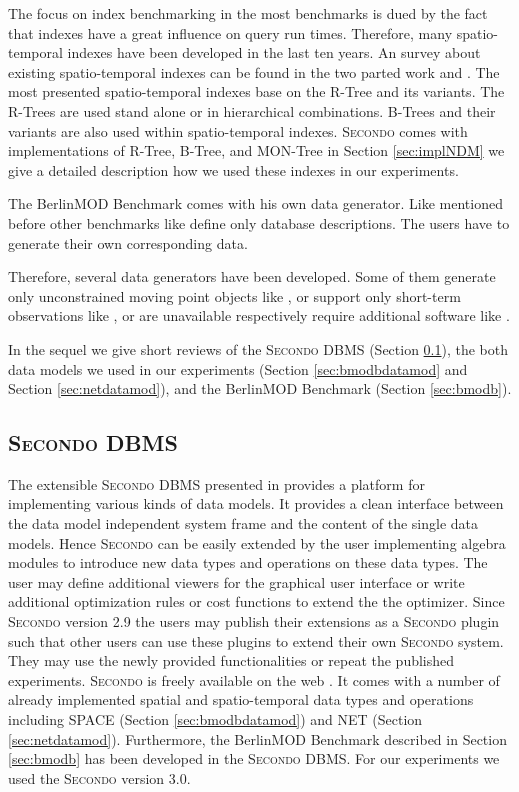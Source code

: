 \documentclass[a4paper]{article}
\newcommand{\secondo}{\textsc{Secondo}}
\newcommand{\bmodb} {BerlinMOD Benchmark}
\begin{document}
The focus on index benchmarking in the most benchmarks is dued by the fact that
indexes have a great influence on query run times. Therefore, many spatio-temporal
indexes have been developed in the last ten years. An survey about existing spatio-temporal
indexes can be found in the two parted work \cite{STAMSurvey1} and \cite{STAMSurvey2}.
The most presented spatio-temporal indexes base on the R-Tree \cite{RTreeGuttmann}
and its variants. The R-Trees are used stand alone or in hierarchical combinations.
B-Trees \cite{BTreeBayer} and their variants are also used within spatio-temporal
indexes. \secondo{} comes with implementations of R-Tree, B-Tree, and MON-Tree
\cite{MONTreeAlmeidaGeoinformatica} in Section \ref{sec:implNDM} we give a detailed
description how we used these indexes in our experiments.

The \bmodb{} comes with his own data generator. Like mentioned before other
benchmarks like \cite{QueriesTheodoridis} define only database descriptions.
The users have to generate their own corresponding data.

Therefore, several data generators have been developed. Some of them generate
only unconstrained moving point objects like \cite{OportoSaglio}, or support
only short-term observations like \cite{BrinkhoffsDataGenerator}, or are
unavailable respectively require additional software like \cite{STACTS}.

In the sequel we give short reviews of the \secondo{} DBMS
(Section \ref{sec:secondo}), the both data models we used in our experiments
(Section \ref{sec:bmodbdatamod} and Section \ref{sec:netdatamod}), and the \bmodb{}
(Section \ref{sec:bmodb}).
\subsection{\secondo{} DBMS}
\label{sec:secondo}
The extensible \secondo{} DBMS presented in
\cite{SecondoEnvironmentDieker,SecondoPlatformPrototypingGueting} provides a
platform for implementing various kinds of data models. It provides a clean
interface between the data model independent system frame and the content of the
single data models. Hence \secondo{} can be easily extended by the user
implementing algebra modules to introduce new data types and operations on
these data types. The user may define additional viewers for the graphical user
interface or write additional optimization rules or cost functions to extend the
the optimizer. Since \secondo{} version 2.9 the users may publish their extensions
as a \secondo{} plugin such that other users can use these plugins to extend their own
\secondo{} system. They may use the newly provided functionalities or repeat the
published experiments. \secondo{} is freely available on the web \cite{secondoweb}.
It comes with a number of already implemented spatial and spatio-temporal data types
and operations including SPACE (Section \ref{sec:bmodbdatamod}) and NET
(Section \ref{sec:netdatamod}). Furthermore, the \bmodb{}
described in Section \ref{sec:bmodb} has been developed in the \secondo{} DBMS.
For our experiments we used the \secondo{} version 3.0.
\end{document}
